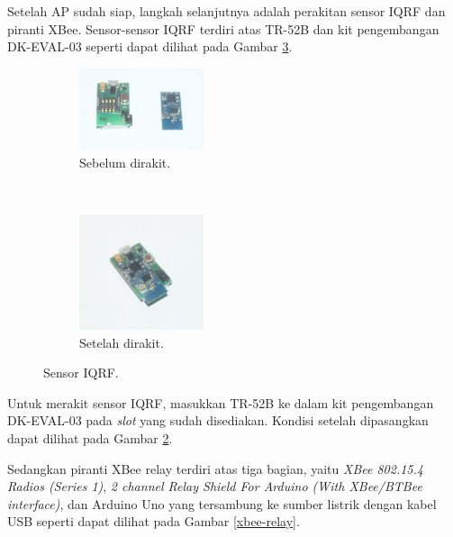 			Setelah AP sudah siap, langkah selanjutnya adalah perakitan sensor IQRF dan piranti XBee. Sensor-sensor IQRF terdiri atas TR-52B dan kit pengembangan DK-EVAL-03 seperti dapat dilihat pada Gambar \ref{iqrf-node}.

			\begin{figure}[H]
				\begin{subfigure}[b]{\textwidth}
					\centering
				    \includegraphics[width=0.4\textwidth]{gambar/iqrf-node-stripped}
				    \caption{Sebelum dirakit.}
				    \label{iqrf-node-stripped}
				\end{subfigure}
				 ~
				\begin{subfigure}[b]{\textwidth}
					\centering
				    \includegraphics[width=0.4\textwidth]{gambar/iqrf-node-complete}
				    \caption{Setelah dirakit.}
				    \label{iqrf-node-complete}
				\end{subfigure}
				\caption{Sensor IQRF.}
				\label{iqrf-node}
			\end{figure}

			Untuk merakit sensor IQRF, masukkan TR-52B ke dalam kit pengembangan DK-EVAL-03 pada \emph{slot} yang sudah disediakan. Kondisi setelah dipasangkan dapat dilihat pada Gambar \ref{iqrf-node-complete}.

			Sedangkan piranti XBee relay terdiri atas tiga bagian, yaitu \emph{XBee 802.15.4 Radios (Series 1)}, \emph{2 channel Relay Shield For Arduino (With XBee/BTBee interface)}, dan Arduino Uno yang tersambung ke sumber listrik dengan kabel USB seperti dapat dilihat pada Gambar \ref{xbee-relay}.

